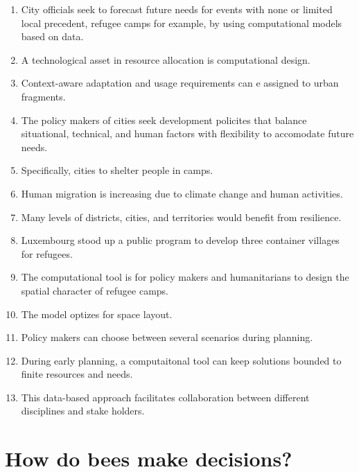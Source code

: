 \documentclass[a4paper,11pt]{article}
\begin{document}
\begin{enumerate}

\item City officials seek to forecast future needs for events with none or limited local precedent, refugee camps for example, by using computational models based on data.

\item A technological asset in resource allocation is computational design.
\item Context-aware adaptation and usage requirements can e assigned to urban fragments.
\item The policy makers of cities seek development policites that balance situational, technical, and human factors with flexibility to accomodate future needs.
\item Specifically, cities to shelter people in camps.
\item Human migration is increasing due to climate change and human activities.
\item Many levels of districts, cities, and territories would benefit from resilience.
\item Luxembourg stood up a public program to develop three container villages for refugees.
\item The computational tool is for policy makers and humanitarians to design the spatial character of refugee camps.
\item The model optizes for space layout.
\item Policy makers can choose between several scenarios during planning.
\item During early planning, a computaitonal tool can keep solutions bounded to finite resources and needs.
\item This data-based approach facilitates collaboration between different disciplines and stake holders.


\end{enumerate}

\section{How do bees make decisions?}
\end{document}
